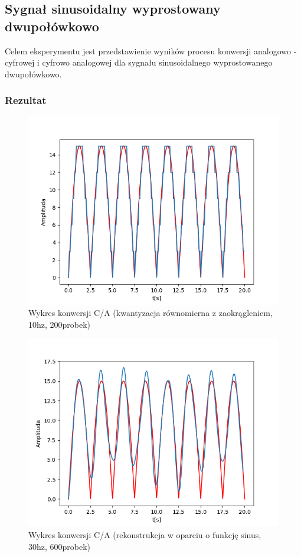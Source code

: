 \documentclass[12pt]{article}
\begin{document}
\subsection{Sygnał sinusoidalny wyprostowany dwupołówkowo}
Celem eksperymentu jest przedstawienie wyników procesu konwersji analogowo - cyfrowej i cyfrowo analogowej dla sygnału  sinusoidalnego wyprostowanego dwupołówkowo.
\label{syg2}
\subsubsection{Rezultat}


\begin{figure}[H]
\centering
\includegraphics[scale=0.6]{10sygsinusDwuSin200kwantyzacja.png}
\caption{Wykres konwersji C/A (kwantyzacja równomierna z zaokrągleniem, 10hz, 200probek)}
\end{figure}

\begin{figure}[H]
\centering
\includegraphics[scale=0.6]{11sygsinusDwuSin30czest.png}
\caption{Wykres konwersji C/A (rekonstrukcja w oparciu o funkcję sinus, 30hz, 600probek)}
\end{figure}
\end{document}
